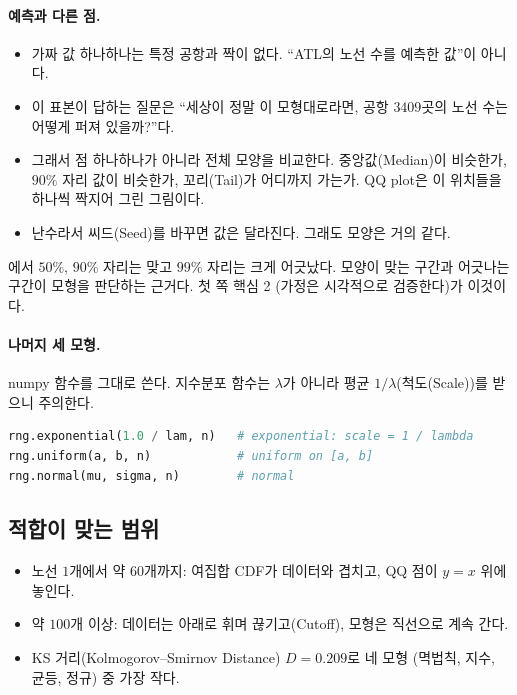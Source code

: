 \documentclass[11pt]{article}
\begin{document}
\paragraph{예측과 다른 점.}
\begin{itemize}
  \item 가짜 값 하나하나는 특정 공항과 짝이 없다. ``ATL의 노선 수를 예측한 값''이 아니다.
  \item 이 표본이 답하는 질문은 ``세상이 정말 이 모형대로라면, 공항 $3409$곳의 노선 수는
        어떻게 퍼져 있을까?''다.
  \item 그래서 점 하나하나가 아니라 전체 모양을 비교한다. 중앙값(Median)이 비슷한가,
        $90\%$ 자리 값이 비슷한가, 꼬리(Tail)가 어디까지 가는가. QQ plot은 이 위치들을
        하나씩 짝지어 그린 그림이다.
  \item 난수라서 씨드(Seed)를 바꾸면 값은 달라진다. 그래도 모양은 거의 같다.
\end{itemize}
에서 $50\%$, $90\%$ 자리는 맞고 $99\%$ 자리는 크게 어긋났다.
모양이 맞는 구간과 어긋나는 구간이 모형을 판단하는 근거다. 첫 쪽 핵심 2
(가정은 시각적으로 검증한다)가 이것이다.

\paragraph{나머지 세 모형.} numpy 함수를 그대로 쓴다. 지수분포 함수는 $\lambda$가 아니라
평균 $1/\lambda$(척도(Scale))를 받으니 주의한다.
\begin{lstlisting}[language=Python]
rng.exponential(1.0 / lam, n)   # exponential: scale = 1 / lambda
rng.uniform(a, b, n)            # uniform on [a, b]
rng.normal(mu, sigma, n)        # normal
\end{lstlisting}

\subsection{적합이 맞는 범위}
\label{sec:p1a-range}
\begin{itemize}
  \item 노선 $1$개에서 약 $60$개까지: 여집합 CDF가 데이터와 겹치고,
        QQ 점이 $y = x$ 위에 놓인다.
  \item 약 $100$개 이상: 데이터는 아래로 휘며 끊기고(Cutoff), 모형은 직선으로
        계속 간다.
  \item KS 거리(Kolmogorov--Smirnov Distance) $D = 0.209$로 네 모형
        (멱법칙, 지수, 균등, 정규) 중 가장 작다.
\end{itemize}
\end{document}
